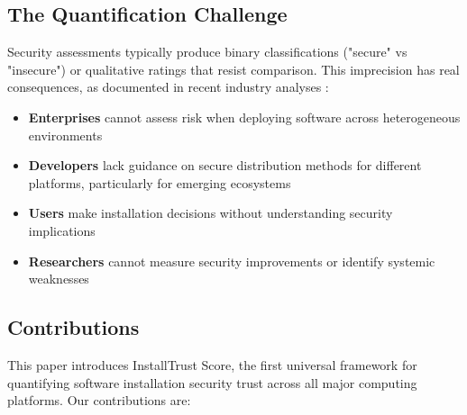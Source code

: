 \documentclass[11pt,a4paper]{article}
\begin{document}
\subsection{The Quantification Challenge}

Security assessments typically produce binary classifications ("secure" vs "insecure") or qualitative ratings that resist comparison. This imprecision has real consequences, as documented in recent industry analyses \cite{forrester2024appsec,gartner2024supply}:

\begin{itemize}
    \item \textbf{Enterprises} cannot assess risk when deploying software across heterogeneous environments
    \item \textbf{Developers} lack guidance on secure distribution methods for different platforms, particularly for emerging ecosystems \cite{rustup2024security,golang2024modules}
    \item \textbf{Users} make installation decisions without understanding security implications
    \item \textbf{Researchers} cannot measure security improvements or identify systemic weaknesses \cite{zahan2024packages}
\end{itemize}

\subsection{Contributions}

This paper introduces InstallTrust Score, the first universal framework for quantifying software installation security trust across all major computing platforms. Our contributions are:
\end{document}
